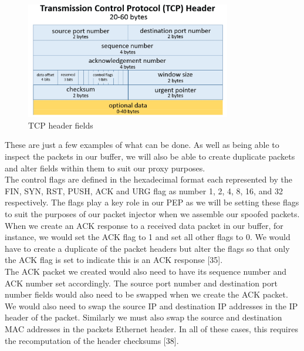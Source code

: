 \documentclass{uathesis}
\begin{document}
\begin{figure}[h!]
    \centering
    \includegraphics[width=0.8\textwidth]{tcp.PNG}
    \caption{TCP header fields}
    \label{fig:TCP Header}     
\end{figure}

These are just a few examples of what can be done. As well as being able to inspect the packets in our buffer, we will also be able to create duplicate packets and alter fields within them to suit our proxy purposes. \\

The control flags are defined in the hexadecimal format each represented by the FIN, SYN, RST, PUSH, ACK and URG flag as number 1, 2, 4, 8, 16,  and 32 respectively. The flags play a key role in our PEP as we will be setting these flags to suit the purposes of our packet injector when we assemble our spoofed packets. When we create an ACK response to a received data packet in our buffer, for instance, we would set the ACK flag to 1 and set all other flags to 0. We would have to create a duplicate of the packet headers but alter the flags so that only the ACK flag is set to indicate this is an ACK response [35]. \\

The ACK packet we created would also need to have its sequence number and ACK number set accordingly. The source port number and destination port number fields would also need to be swapped when we create the ACK packet. We would also need to swap the source IP and destination IP addresses in the IP header of the packet. Similarly we must also swap the source and destination MAC addresses in the packets Ethernet header. In all of these cases, this requires the recomputation of the header checksums [38].\\
\end{document}
